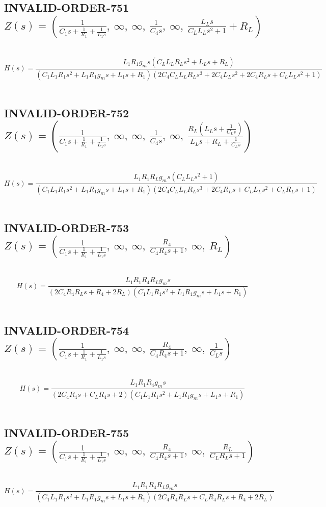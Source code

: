 \documentclass{article}
\begin{document}
\subsection{INVALID-ORDER-751 $Z(s) = \left( \frac{1}{C_{1} s + \frac{1}{R_{1}} + \frac{1}{L_{1} s}}, \  \infty, \  \infty, \  \frac{1}{C_{4} s}, \  \infty, \  \frac{L_{L} s}{C_{L} L_{L} s^{2} + 1} + R_{L}\right)$ } \ 
\textbf{\[H(s) = \frac{L_{1} R_{1} g_{m} s \left(C_{L} L_{L} R_{L} s^{2} + L_{L} s + R_{L}\right)}{\left(C_{1} L_{1} R_{1} s^{2} + L_{1} R_{1} g_{m} s + L_{1} s + R_{1}\right) \left(2 C_{4} C_{L} L_{L} R_{L} s^{3} + 2 C_{4} L_{L} s^{2} + 2 C_{4} R_{L} s + C_{L} L_{L} s^{2} + 1\right)}\] } \ 
\subsection{INVALID-ORDER-752 $Z(s) = \left( \frac{1}{C_{1} s + \frac{1}{R_{1}} + \frac{1}{L_{1} s}}, \  \infty, \  \infty, \  \frac{1}{C_{4} s}, \  \infty, \  \frac{R_{L} \left(L_{L} s + \frac{1}{C_{L} s}\right)}{L_{L} s + R_{L} + \frac{1}{C_{L} s}}\right)$ } \ 
\textbf{\[H(s) = \frac{L_{1} R_{1} R_{L} g_{m} s \left(C_{L} L_{L} s^{2} + 1\right)}{\left(C_{1} L_{1} R_{1} s^{2} + L_{1} R_{1} g_{m} s + L_{1} s + R_{1}\right) \left(2 C_{4} C_{L} L_{L} R_{L} s^{3} + 2 C_{4} R_{L} s + C_{L} L_{L} s^{2} + C_{L} R_{L} s + 1\right)}\] } \ 
\subsection{INVALID-ORDER-753 $Z(s) = \left( \frac{1}{C_{1} s + \frac{1}{R_{1}} + \frac{1}{L_{1} s}}, \  \infty, \  \infty, \  \frac{R_{4}}{C_{4} R_{4} s + 1}, \  \infty, \  R_{L}\right)$ } \ 
\textbf{\[H(s) = \frac{L_{1} R_{1} R_{4} R_{L} g_{m} s}{\left(2 C_{4} R_{4} R_{L} s + R_{4} + 2 R_{L}\right) \left(C_{1} L_{1} R_{1} s^{2} + L_{1} R_{1} g_{m} s + L_{1} s + R_{1}\right)}\] } \ 
\subsection{INVALID-ORDER-754 $Z(s) = \left( \frac{1}{C_{1} s + \frac{1}{R_{1}} + \frac{1}{L_{1} s}}, \  \infty, \  \infty, \  \frac{R_{4}}{C_{4} R_{4} s + 1}, \  \infty, \  \frac{1}{C_{L} s}\right)$ } \ 
\textbf{\[H(s) = \frac{L_{1} R_{1} R_{4} g_{m} s}{\left(2 C_{4} R_{4} s + C_{L} R_{4} s + 2\right) \left(C_{1} L_{1} R_{1} s^{2} + L_{1} R_{1} g_{m} s + L_{1} s + R_{1}\right)}\] } \ 
\subsection{INVALID-ORDER-755 $Z(s) = \left( \frac{1}{C_{1} s + \frac{1}{R_{1}} + \frac{1}{L_{1} s}}, \  \infty, \  \infty, \  \frac{R_{4}}{C_{4} R_{4} s + 1}, \  \infty, \  \frac{R_{L}}{C_{L} R_{L} s + 1}\right)$ } \ 
\textbf{\[H(s) = \frac{L_{1} R_{1} R_{4} R_{L} g_{m} s}{\left(C_{1} L_{1} R_{1} s^{2} + L_{1} R_{1} g_{m} s + L_{1} s + R_{1}\right) \left(2 C_{4} R_{4} R_{L} s + C_{L} R_{4} R_{L} s + R_{4} + 2 R_{L}\right)}\] } \ 
\end{document}
